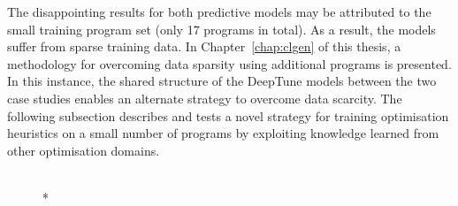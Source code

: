 The disappointing results for both predictive models may be attributed to the small training program set (only 17 programs in total). As a result, the models suffer from sparse training data. In Chapter~\ref{chap:clgen} of this thesis, a methodology for overcoming data sparsity using additional programs is presented. In this instance, the shared structure of the DeepTune models between the two case studies enables an alternate strategy to overcome data scarcity. The following subsection describes and tests a novel strategy for training optimisation heuristics on a small number of programs by exploiting knowledge learned from other optimisation domains.

\begin{figure}
  \centering %
  \\*
\end{figure}
